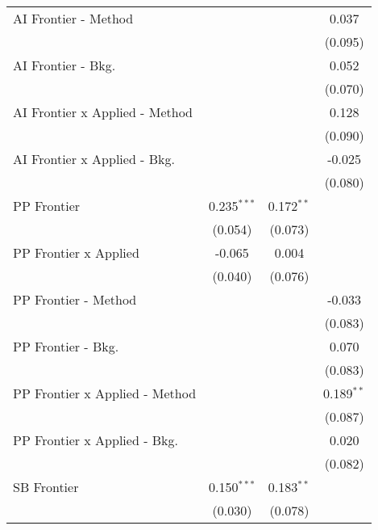 \begin{tabular}{lccc}
   AI Frontier - Method           &               &               & 0.037\\   
                                  &               &               & (0.095)\\   
   AI Frontier - Bkg.             &               &               & 0.052\\   
                                  &               &               & (0.070)\\   
   AI Frontier x Applied - Method &               &               & 0.128\\   
                                  &               &               & (0.090)\\   
   AI Frontier x Applied - Bkg.   &               &               & -0.025\\   
                                  &               &               & (0.080)\\   
   PP Frontier                    & 0.235$^{***}$ & 0.172$^{**}$  &   \\   
                                  & (0.054)       & (0.073)       &   \\   
   PP Frontier x Applied          & -0.065        & 0.004         &   \\   
                                  & (0.040)       & (0.076)       &   \\   
   PP Frontier - Method           &               &               & -0.033\\   
                                  &               &               & (0.083)\\   
   PP Frontier - Bkg.             &               &               & 0.070\\   
                                  &               &               & (0.083)\\   
   PP Frontier x Applied - Method &               &               & 0.189$^{**}$\\   
                                  &               &               & (0.087)\\   
   PP Frontier x Applied - Bkg.   &               &               & 0.020\\   
                                  &               &               & (0.082)\\   
   SB Frontier                    & 0.150$^{***}$ & 0.183$^{**}$  &   \\   
                                  & (0.030)       & (0.078)       &   \\   

\end{tabular}
